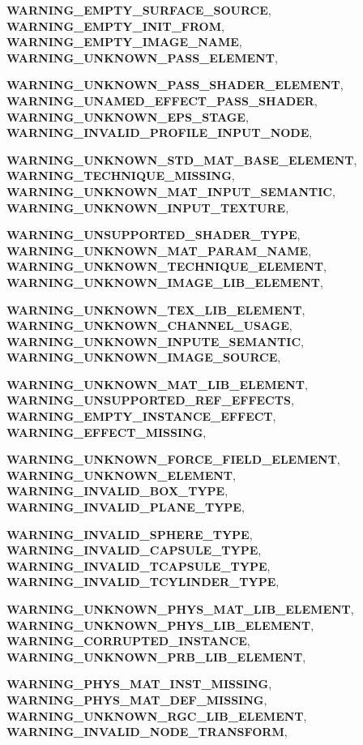 \begin{DoxyCompactItemize}
\par
{\bfseries WARNING\_\-EMPTY\_\-SURFACE\_\-SOURCE}, 
{\bfseries WARNING\_\-EMPTY\_\-INIT\_\-FROM}, 
{\bfseries WARNING\_\-EMPTY\_\-IMAGE\_\-NAME}, 
{\bfseries WARNING\_\-UNKNOWN\_\-PASS\_\-ELEMENT}, 
\par
{\bfseries WARNING\_\-UNKNOWN\_\-PASS\_\-SHADER\_\-ELEMENT}, 
{\bfseries WARNING\_\-UNAMED\_\-EFFECT\_\-PASS\_\-SHADER}, 
{\bfseries WARNING\_\-UNKNOWN\_\-EPS\_\-STAGE}, 
{\bfseries WARNING\_\-INVALID\_\-PROFILE\_\-INPUT\_\-NODE}, 
\par
{\bfseries WARNING\_\-UNKNOWN\_\-STD\_\-MAT\_\-BASE\_\-ELEMENT}, 
{\bfseries WARNING\_\-TECHNIQUE\_\-MISSING}, 
{\bfseries WARNING\_\-UNKNOWN\_\-MAT\_\-INPUT\_\-SEMANTIC}, 
{\bfseries WARNING\_\-UNKNOWN\_\-INPUT\_\-TEXTURE}, 
\par
{\bfseries WARNING\_\-UNSUPPORTED\_\-SHADER\_\-TYPE}, 
{\bfseries WARNING\_\-UNKNOWN\_\-MAT\_\-PARAM\_\-NAME}, 
{\bfseries WARNING\_\-UNKNOWN\_\-TECHNIQUE\_\-ELEMENT}, 
{\bfseries WARNING\_\-UNKNOWN\_\-IMAGE\_\-LIB\_\-ELEMENT}, 
\par
{\bfseries WARNING\_\-UNKNOWN\_\-TEX\_\-LIB\_\-ELEMENT}, 
{\bfseries WARNING\_\-UNKNOWN\_\-CHANNEL\_\-USAGE}, 
{\bfseries WARNING\_\-UNKNOWN\_\-INPUTE\_\-SEMANTIC}, 
{\bfseries WARNING\_\-UNKNOWN\_\-IMAGE\_\-SOURCE}, 
\par
{\bfseries WARNING\_\-UNKNOWN\_\-MAT\_\-LIB\_\-ELEMENT}, 
{\bfseries WARNING\_\-UNSUPPORTED\_\-REF\_\-EFFECTS}, 
{\bfseries WARNING\_\-EMPTY\_\-INSTANCE\_\-EFFECT}, 
{\bfseries WARNING\_\-EFFECT\_\-MISSING}, 
\par
{\bfseries WARNING\_\-UNKNOWN\_\-FORCE\_\-FIELD\_\-ELEMENT}, 
{\bfseries WARNING\_\-UNKNOWN\_\-ELEMENT}, 
{\bfseries WARNING\_\-INVALID\_\-BOX\_\-TYPE}, 
{\bfseries WARNING\_\-INVALID\_\-PLANE\_\-TYPE}, 
\par
{\bfseries WARNING\_\-INVALID\_\-SPHERE\_\-TYPE}, 
{\bfseries WARNING\_\-INVALID\_\-CAPSULE\_\-TYPE}, 
{\bfseries WARNING\_\-INVALID\_\-TCAPSULE\_\-TYPE}, 
{\bfseries WARNING\_\-INVALID\_\-TCYLINDER\_\-TYPE}, 
\par
{\bfseries WARNING\_\-UNKNOWN\_\-PHYS\_\-MAT\_\-LIB\_\-ELEMENT}, 
{\bfseries WARNING\_\-UNKNOWN\_\-PHYS\_\-LIB\_\-ELEMENT}, 
{\bfseries WARNING\_\-CORRUPTED\_\-INSTANCE}, 
{\bfseries WARNING\_\-UNKNOWN\_\-PRB\_\-LIB\_\-ELEMENT}, 
\par
{\bfseries WARNING\_\-PHYS\_\-MAT\_\-INST\_\-MISSING}, 
{\bfseries WARNING\_\-PHYS\_\-MAT\_\-DEF\_\-MISSING}, 
{\bfseries WARNING\_\-UNKNOWN\_\-RGC\_\-LIB\_\-ELEMENT}, 
{\bfseries WARNING\_\-INVALID\_\-NODE\_\-TRANSFORM}, 

\end{DoxyCompactItemize}
